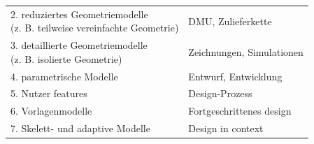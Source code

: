 \documentclass[10pt,a4paper,fleqn]{article}
\begin{document}
\begin{enumerate}
\begin{tabular}{l|l}
			\pbox{20cm}{2. reduziertes Geometriemodelle \\ \mbox{}\hspace{0.4cm}(z. B. teilweise vereinfachte Geometrie) } & DMU, Zulieferkette \\ 
			\pbox{20cm}{3. detaillierte Geometriemodelle \\ \mbox{}\hspace{0.4cm}(z. B. isolierte Geometrie)} & Zeichnungen, Simulationen \\ 
		 	4. parametrische Modelle & Entwurf, Entwicklung \\ 
			5. Nutzer features & Design-Prozess \\ 
			6. Vorlagenmodelle & Fortgeschrittenes design \\ 
			7. Skelett- und adaptive Modelle  & Design in context \\ 
		\end{tabular}

\end{enumerate}
\end{document}
